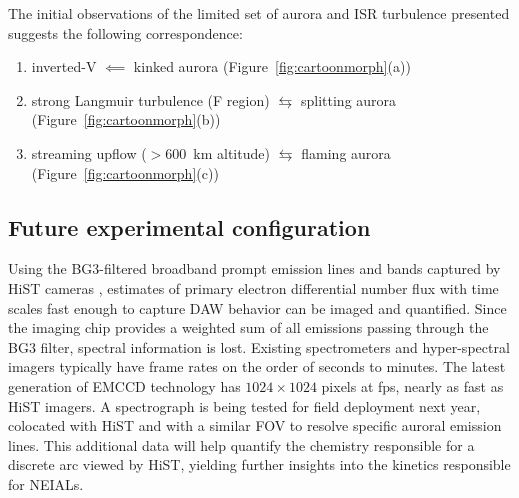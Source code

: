 The initial observations of the limited set of aurora and ISR turbulence presented suggests the following correspondence:
\begin{enumerate}
    \item inverted-V $\impliedby$ kinked aurora (Figure~\ref{fig:cartoonmorph}(a))
    \item strong Langmuir turbulence (F region) $\leftrightarrows$ splitting aurora (Figure~\ref{fig:cartoonmorph}(b))
    \item streaming upflow ($> 600$~km altitude)  $\leftrightarrows$ flaming aurora (Figure~\ref{fig:cartoonmorph}(c))
    
\end{enumerate}

\subsection{Future experimental configuration}\label{sec:future}
Using the BG3-filtered broadband prompt emission lines and bands captured by HiST cameras \citep{hirsch2016}, estimates of primary electron differential number flux with time scales fast enough to capture DAW behavior can be imaged and quantified.
Since the imaging chip provides a weighted sum of all emissions passing through the BG3 filter, spectral information is lost.
Existing spectrometers and hyper-spectral imagers \citep{goenka2016} typically have frame rates on the order of seconds to minutes.
The latest generation of EMCCD technology has $1024 \times 1024$ pixels at \unit[25]{fps}, nearly as fast as HiST imagers. 
A spectrograph is being tested for field deployment next year, colocated with HiST and with a similar FOV to resolve specific auroral emission lines. 
This additional data will help quantify the chemistry responsible for a discrete arc viewed by HiST, yielding further insights into the kinetics responsible for NEIALs.
